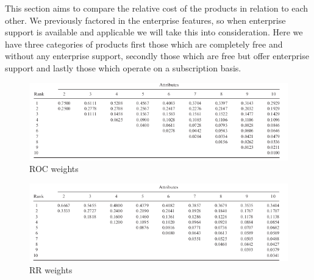 


This section aims to compare the relative cost of the products in relation to each other.
We previously factored in the enterprise features, so when enterprise support is available and applicable we will take this into consideration.
Here we have three categories of products first those which are completely free and without any enterprise support, secondly those which are free but offer enterprise support and lastly those which operate on a subscription basis.




\newpage
{}


\begin{figure}[H]
  \centering
  \includegraphics[width=16cm]{graphics/ROC_weights.png}
  \caption[ROC weights]{ROC weights \footnotemark}
  \label{abb:Roc_weights}
\end{figure}


\begin{figure}[H]
    \centering
    \includegraphics[width=16cm]{graphics/RR_weigths.png}
    \caption[RR weights]{RR weights \footnotemark}
    \label{abb:RR_weights}
  \end{figure}
  
